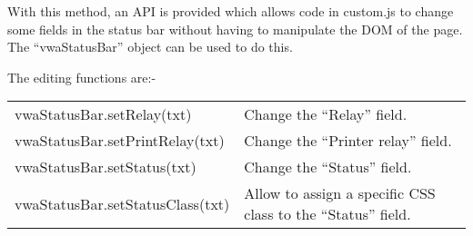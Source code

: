 \documentclass[letterpaper,10pt,english]{sphinxmanual}
\begin{document}
\begin{sphinxVerbatim}[commandchars=\\\{\}]
       
      
    
    
  
\end{sphinxVerbatim}


With this method, an API is provided which allows code in custom.js to change some fields in the status bar without having to manipulate the DOM of the page. The “vwaStatusBar” object can be used to do this.

The editing functions are:-


\begin{savenotes}\sphinxattablestart
\centering
\begin{tabulary}{\linewidth}[t]{|T|T|}
\hline
{}\relax &\relax \\
\hline
vwaStatusBar.setRelay(txt)
&
Change the “Relay” field.
\\
\hline
vwaStatusBar.setPrintRelay(txt)
&
Change the “Printer relay” field.
\\
\hline
vwaStatusBar.setStatus(txt)
&
Change the “Status” field.
\\
\hline
vwaStatusBar.setStatusClass(txt)
&
Allow to assign a specific CSS class to the “Status” field.
\\
\hline
\end{tabulary}
\par
\sphinxattableend\end{savenotes}
\end{document}
